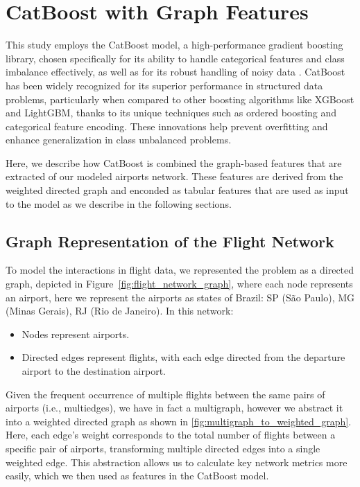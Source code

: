 \section{CatBoost with Graph Features}
\label{sec:catboost_model}

This study employs the CatBoost model, a high-performance gradient boosting library, chosen specifically for its ability to handle categorical features and class imbalance effectively, as well as for its robust handling of noisy data \cite{prokhorenkova2018catboost}. CatBoost has been widely recognized for its superior performance in structured data problems, particularly when compared to other boosting algorithms like XGBoost and LightGBM, thanks to its unique techniques such as ordered boosting and categorical feature encoding. These innovations help prevent overfitting and enhance generalization in class unbalanced problems.

Here, we describe how CatBoost is combined the graph-based features that are extracted of our modeled airports network. These features are derived from the weighted directed graph and enconded as tabular features that are used as input to the model as we describe in the following sections.


\subsection{Graph Representation of the Flight Network}



To model the interactions in flight data, we represented the problem as a directed graph, depicted in Figure~\ref{fig:flight_network_graph}, where each node represents an airport, here we represent the airports as states of Brazil: SP (São Paulo), MG (Minas Gerais), RJ (Rio de Janeiro). In this network:
\begin{itemize}
    \item Nodes represent airports.
    \item Directed edges represent flights, with each edge directed from the departure airport to the destination airport.
\end{itemize}
Given the frequent occurrence of multiple flights between the same pairs of airports (i.e., multiedges), we have in fact a multigraph, however we abstract it into a weighted directed graph as shown in \ref{fig:multigraph_to_weighted_graph}. Here, each edge's weight corresponds to the total number of flights between a specific pair of airports, transforming multiple directed edges into a single weighted edge. This abstraction allows us to calculate key network metrics more easily, which we then used as features in the CatBoost model.

